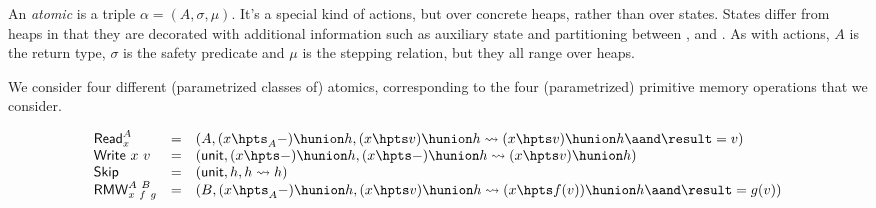 An \emph{atomic} is a triple $\alpha = (A, \sigma, \mu)$. It's a
special kind of actions, but over concrete heaps, rather than over
states. States differ from heaps in that they are decorated with
additional information such as auxiliary state and partitioning
between \self, \joint and \other.  As with actions, $A$ is the return
type, $\sigma$ is the safety predicate and $\mu$ is the stepping
relation, but they all range over heaps.

We consider four different (parametrized classes of) atomics,
corresponding to the four (parametrized) primitive memory operations
that we consider.

\begin{definition}
\label{def:actions}
{\small
\[
\begin{array}{lcl}
  \mathsf{Read}^A_x & = & (A, (x \hpts_A -) \hunion h, (x \hpts v) \hunion h \rightsquigarrow (x \hpts v) \hunion h \aand \result = v)\\
  \mathsf{Write}\ x\ v & = & (\mathsf{unit}, (x \hpts -) \hunion h, (x
  \hpts -) \hunion h \rightsquigarrow (x \hpts v) \hunion h)\\
  \mathsf{Skip} & = & (\mathsf{unit}, h, h \rightsquigarrow h) 
  \\
  \mathsf{RMW}^{A~B}_{x~f~g} & = & (B, (x \hpts_A -) \hunion h, (x
  \hpts v) \hunion h \rightsquigarrow (x \hpts f(v)) \hunion h \aand \result = g(v))
\end{array}
\label{eq:actions}
\]}
  
\end{definition}

